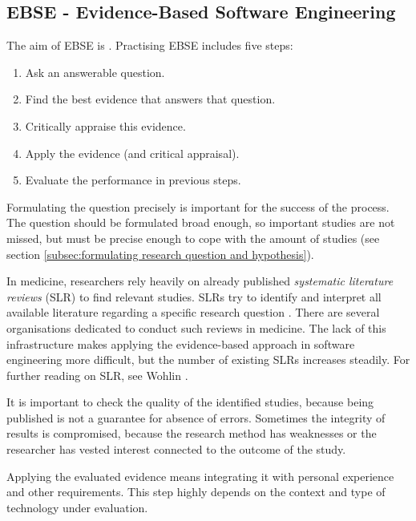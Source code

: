 
\subsection{EBSE - Evidence-Based Software Engineering}
\label{subsec:EBSE}

The aim of EBSE is  \cite{Dyba2005}. Practising EBSE includes five steps:
\begin{enumerate}
	\item Ask an answerable question.
	\item Find the best evidence that answers that question.
	\item Critically appraise this evidence.
	\item Apply the evidence (and critical appraisal).
	\item Evaluate the performance in previous steps.
\end{enumerate}
Formulating the question precisely is important for the success of the process. The question should be formulated broad enough, so important studies are not missed, but must be precise enough to cope with the amount of studies (see section \ref{subsec:formulating research question and hypothesis}).

In medicine, researchers rely heavily on already published \emph{systematic literature reviews} (SLR) to find relevant studies. SLRs try to identify and interpret all available literature regarding a specific research question \cite{keele2007}. There are several organisations dedicated to conduct such reviews in medicine. The lack of this infrastructure makes applying the evidence-based approach in software engineering more difficult, but the number of existing SLRs increases steadily. For further reading on SLR, see Wohlin \etal \cite{Wohlin2012}.

It is important to check the quality of the identified studies, because being published is not a guarantee for absence of errors. Sometimes the integrity of results is compromised, because the research method has weaknesses or the researcher has vested interest connected to the outcome of the study.

Applying the evaluated evidence means integrating it with personal experience and other requirements. This step highly depends on the context and type of technology under evaluation.

